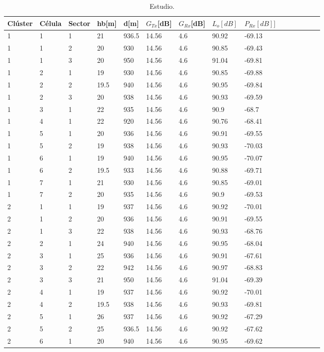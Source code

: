 \documentclass[11pt,letterpaper]{article}
\begin{document}
\newpage
\begin{table}[ht]
    \centering
    \begin{tabular}{|l|l|l|l|l|l|l|l|l|l|l|l|l|l|l|}
    \hline
    Clúster & Célula & Sector & hb[m] & d[m] & $G_{Tx}$[dB] & $G_{Rx}$[dB] & $L_o[dB]$ & $P_{Rx}[dB]]$ \\ \hline
    1 & 1 & 1 & 21 & 936.5 & 14.56 & 4.6 & 90.92 & -69.13 \\ \hline
    1 & 1 & 2 & 20 & 930 & 14.56 & 4.6 & 90.85 & -69.43 \\ \hline
    1 & 1 & 3 & 20 & 950 & 14.56 & 4.6 & 91.04 & -69.81 \\ \hline
    1 & 2 & 1 & 19 & 930 & 14.56 & 4.6 & 90.85 & -69.88 \\ \hline
    1 & 2 & 2 & 19.5 & 940 & 14.56 & 4.6 & 90.95 & -69.84 \\ \hline
    1 & 2 & 3 & 20 & 938 & 14.56 & 4.6 & 90.93 & -69.59 \\ \hline
    1 & 3 & 1 & 22 & 935 & 14.56 & 4.6 & 90.9 & -68.7 \\ \hline
    1 & 4 & 1 & 22 & 920 & 14.56 & 4.6 & 90.76 & -68.41 \\ \hline
    1 & 5 & 1 & 20 & 936 & 14.56 & 4.6 & 90.91 & -69.55 \\ \hline
    1 & 5 & 2 & 19 & 938 & 14.56 & 4.6 & 90.93 & -70.03 \\ \hline
    1 & 6 & 1 & 19 & 940 & 14.56 & 4.6 & 90.95 & -70.07 \\ \hline
    1 & 6 & 2 & 19.5 & 933 & 14.56 & 4.6 & 90.88 & -69.71 \\ \hline
    1 & 7 & 1 & 21 & 930 & 14.56 & 4.6 & 90.85 & -69.01 \\ \hline
    1 & 7 & 2 & 20 & 935 & 14.56 & 4.6 & 90.9 & -69.53 \\ \hline
    2 & 1 & 1 & 19 & 937 & 14.56 & 4.6 & 90.92 & -70.01 \\ \hline
    2 & 1 & 2 & 20 & 936 & 14.56 & 4.6 & 90.91 & -69.55 \\ \hline
    2 & 1 & 3 & 22 & 938 & 14.56 & 4.6 & 90.93 & -68.76 \\ \hline
    2 & 2 & 1 & 24 & 940 & 14.56 & 4.6 & 90.95 & -68.04 \\ \hline
    2 & 3 & 1 & 25 & 936 & 14.56 & 4.6 & 90.91 & -67.61 \\ \hline
    2 & 3 & 2 & 22 & 942 & 14.56 & 4.6 & 90.97 & -68.83 \\ \hline
    2 & 3 & 3 & 21 & 950 & 14.56 & 4.6 & 91.04 & -69.39 \\ \hline
    2 & 4 & 1 & 19 & 937 & 14.56 & 4.6 & 90.92 & -70.01 \\ \hline
    2 & 4 & 2 & 19.5 & 938 & 14.56 & 4.6 & 90.93 & -69.81 \\ \hline
    2 & 5 & 1 & 26 & 937 & 14.56 & 4.6 & 90.92 & -67.29 \\ \hline
    2 & 5 & 2 & 25 & 936.5 & 14.56 & 4.6 & 90.92 & -67.62 \\ \hline
    2 & 6 & 1 & 20 & 940 & 14.56 & 4.6 & 90.95 & -69.62 \\ \hline
    \end{tabular}
    \caption{Estudio.}
\end{table}
\end{document}

